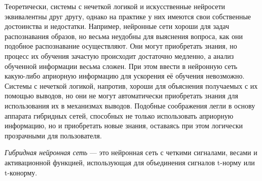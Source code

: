 Теоретически, системы с нечеткой логикой и искусственные нейросети эквивалентны
друг другу, однако на практике у них имеются свои собственные достоинства и недостатки.
Например, нейронные сети хороши для задач распознавания образов, но весьма неудобны
для выяснения вопроса, как они подобное распознавание осуществляют.
Они могут приобретать знания, но процесс их обучения зачастую происходит достаточно
медленно, а анализ обученной информации весьма сложен.
При этом ввести в нейронную сеть какую-либо априорную информацию для ускорения
её обучения невозможно.
Системы с нечеткой логикой, напротив, хороши для объяснения получаемых с их
помощью выводов, но они не могут автоматически приобретать знания для использования
их в механизмах выводов.
Подобные соображения легли в основу аппарата гибридных сетей,
способных не только использовать априорную информацию,
но и приобретать новые знания, оставаясь при этом логически прозрачными для пользователя.

\emph{Гибридная нейронная сеть} --- это нейронная сеть с четкими сигналами,
весами и активационной функцией, использующая для объединения сигналов
t-норму или t-конорму.

